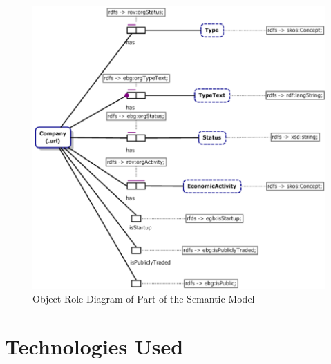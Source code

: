 \documentclass[runningheads,a4paper]{llncs}
\makeatletter
\def\maxwidth#1{\ifdim\Gin@nat@width>#1 #1\else\Gin@nat@width\fi}
\makeatother
\begin{document}
\begin{figure}[h!]
\centering
\includegraphics[width=\maxwidth{\textwidth}]{img/1000000000000363000003489B0EF6FD49C98359.png}
\cprotect\caption{Object-Role Diagram of Part of the Semantic Model}
\label{refFigure5}
\end{figure}


\section{Technologies Used}
\end{document}
